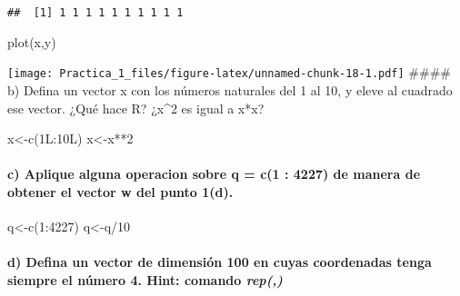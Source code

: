 \documentclass[
]{article}
\newenvironment{Shaded}{\begin{snugshade}}{\end{snugshade}}
\newcommand{\DecValTok}[1]{\textcolor[rgb]{0.00,0.00,0.81}{#1}}
\newcommand{\FunctionTok}[1]{\textcolor[rgb]{0.00,0.00,0.00}{#1}}
\newcommand{\NormalTok}[1]{#1}
\newcommand{\OtherTok}[1]{\textcolor[rgb]{0.56,0.35,0.01}{#1}}
\newcommand{\SpecialCharTok}[1]{\textcolor[rgb]{0.00,0.00,0.00}{#1}}
\begin{document}
\begin{verbatim}
##  [1] 1 1 1 1 1 1 1 1 1 1
\end{verbatim}

\begin{Shaded}
\begin{Highlighting}[]
\FunctionTok{plot}\NormalTok{(x,y)}
\end{Highlighting}
\end{Shaded}

\texttt{[image: Practica\_1\_files/figure-latex/unnamed-chunk-18-1.pdf]}
\#\#\#\# b) Defina un vector x con los números naturales del 1 al 10, y
eleve al cuadrado ese vector. ¿Qué hace R? ¿x\^{}2 es igual a x*x?

\begin{Shaded}
\begin{Highlighting}[]
\NormalTok{x}\OtherTok{\textless{}{-}}\FunctionTok{c}\NormalTok{(1L}\SpecialCharTok{:}\NormalTok{10L)}
\NormalTok{x}\OtherTok{\textless{}{-}}\NormalTok{x}\SpecialCharTok{**}\DecValTok{2}
\end{Highlighting}
\end{Shaded}

\hypertarget{c-aplique-alguna-operacion-sobre-q-c1-4227-de-manera-de-obtener-el-vector-w-del-punto-1d.}{%
\paragraph{c) Aplique alguna operacion sobre q = c(1 : 4227) de manera
de obtener el vector w del punto
1(d).}\label{c-aplique-alguna-operacion-sobre-q-c1-4227-de-manera-de-obtener-el-vector-w-del-punto-1d.}}

\begin{Shaded}
\begin{Highlighting}[]
\NormalTok{q}\OtherTok{\textless{}{-}}\FunctionTok{c}\NormalTok{(}\DecValTok{1}\SpecialCharTok{:}\DecValTok{4227}\NormalTok{)}
\NormalTok{q}\OtherTok{\textless{}{-}}\NormalTok{q}\SpecialCharTok{/}\DecValTok{10}
\end{Highlighting}
\end{Shaded}

\hypertarget{d-defina-un-vector-de-dimensiuxf3n-100-en-cuyas-coordenadas-tenga-siempre-el-nuxfamero-4.-hint-comando-rep}{%
\paragraph{\texorpdfstring{d) Defina un vector de dimensión 100 en cuyas
coordenadas tenga siempre el número 4. Hint: comando
\emph{rep(,)}}{d) Defina un vector de dimensión 100 en cuyas coordenadas tenga siempre el número 4. Hint: comando rep(,)}}\label{d-defina-un-vector-de-dimensiuxf3n-100-en-cuyas-coordenadas-tenga-siempre-el-nuxfamero-4.-hint-comando-rep}}
\end{document}
